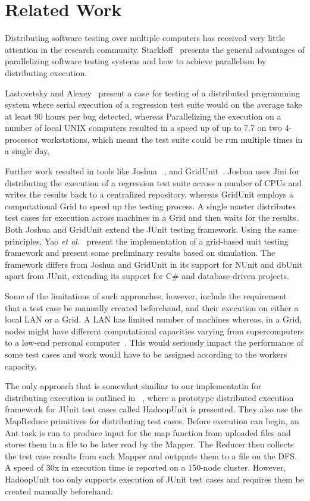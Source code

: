 \section{Related Work}\label{sec:rw}
Distributing software testing over multiple computers has received very little attention in the research community. Starkloff~\cite{stark} presents the general advantages of parallelizing software testing systems and how to achieve parallelism by distributing execution. 

Lastovetsky and Alexey~\cite{lasto} present a case for testing of a distributed programming system where serial execution of a regression test suite would on the average take at least 90 hours per bug detected, whereas Parallelizing the execution on a number of local UNIX computers resulted in a speed up of up to 7.7 on two 4-processor workstations, which meant the test suite could be run multiple times in a single day.

Further work resulted in tools like Joshua ~\cite{Kap}, and GridUnit~\cite{Duarte1, Duarte2, Duarte3}. 
Joshua uses Jini for distributing the execution of a regression test suite across a number of CPUs and 
writes the results back to a centralized repository, whereas GridUnit employs a computational Grid to speed up the testing process. 
A single master distributes test cases for execution across machines in a Grid and then waits for the results.
Both Joshua and GridUnit extend the JUnit testing framework. Using the same principles, Yao \textit{et al.}~\cite{yao} present the implementation of a grid-based unit testing framework and present some preliminary results based on simulation. 
The framework  differs from Joshua and GridUnit in its support for NUnit and dbUnit apart from JUnit, extending its support for C\# and database-driven projects.

Some of the limitations of such approaches, however, include the requirement that a test case be manually created beforehand, and their execution on either a local LAN or a Grid. A LAN has limited number of machines whereas, in a Grid, nodes might have different computational capacities varying from supercomputers to a low-end personal computer~\cite{yao}. This would seriously impact the performance 
of some test cases and work would have to be assigned according to the workers capacity. 

The only approach that is somewhat similiar to our implementatin for distributing execution is outlined in ~\cite{parveen}, where a prototype distributed execution framework for 
JUnit test cases called HadoopUnit is presented. They also use the MapReduce primitives for distributing test cases. Before execution can begin, an Ant task is run 
to produce input for the map function from uploaded files and stores them in a file to be later read by the Mapper. The Reducer then collects the test case results from each Mapper 
and outpputs them to a file on the DFS. A speed of 30x in execution time is reported on a 150-node cluster. 
However, HadoopUnit too only supports execution of JUnit test cases and requires them be created manually beforehand. 

